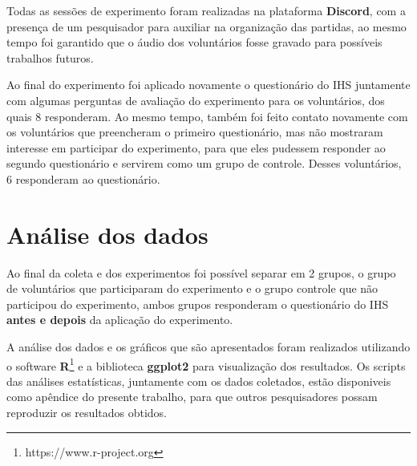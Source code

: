     Todas as sessões de experimento foram realizadas na plataforma \textbf{Discord}, com a presença de um pesquisador para auxiliar na organização das partidas, ao mesmo tempo foi garantido que o áudio dos voluntários fosse gravado para possíveis trabalhos futuros.

    Ao final do experimento foi aplicado novamente o questionário do IHS juntamente com algumas perguntas de avaliação do experimento para os voluntários, dos quais 8 responderam. Ao mesmo tempo, também foi feito contato novamente com os voluntários que preencheram o primeiro questionário, mas não mostraram interesse em participar do experimento, para que eles pudessem responder ao segundo questionário e servirem como um grupo de controle. Desses voluntários, 6 responderam ao questionário.

    \section{Análise dos dados}
            Ao final da coleta e dos experimentos foi possível separar em 2 grupos, o grupo de voluntários que participaram do experimento e o grupo controle que não participou do experimento, ambos grupos responderam o questionário do IHS \textbf{antes e depois} da aplicação do experimento.

            A análise dos dados e os gráficos que são apresentados foram realizados utilizando o software \textbf{R}\footnote{https://www.r-project.org} e a biblioteca \textbf{ggplot2} para visualização dos resultados. Os scripts das análises estatísticas, juntamente com os dados coletados, estão disponiveis como apêndice do presente trabalho, para que outros pesquisadores possam reproduzir os resultados obtidos.